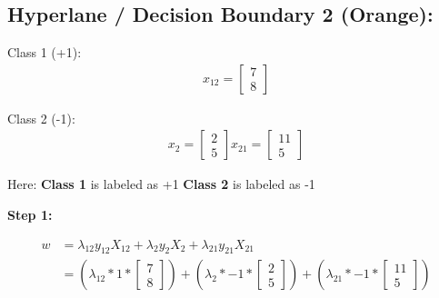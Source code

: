 \documentclass[12pt]{report}
\begin{document}
\vspace{20pt}

\pagebreak
\subsection{Hyperlane / Decision Boundary 2 (Orange):}
Class 1 (+1):
\begin{equation*}
	\begin{aligned}
		x_{12} = \begin{bmatrix}
			         7 \\
			         8
		         \end{bmatrix}
	\end{aligned}
\end{equation*}

Class 2 (-1):
\begin{equation*}
	\begin{aligned}
		x_{2} = \begin{bmatrix}
			        2 \\
			        5
		        \end{bmatrix}
		x_{21} = \begin{bmatrix}
			         11 \\
			         5
		         \end{bmatrix}
	\end{aligned}
\end{equation*}

Here:\newline
\textbf{Class 1} is labeled as +1 \newline
\textbf{Class 2} is labeled as -1


\textbf{Step 1:}

\begin{equation*}
	\begin{aligned}
		w & = \lambda_{12}y_{12}X_{12} + \lambda_{2}y_{2}X_{2}   + \lambda_{21}y_{21}X_{21}                                  \\
		  & = (\lambda_{12} * 1 * \begin{bmatrix}
			                          7 \\
			                          8
		                          \end{bmatrix}) + (\lambda_{2} * -1 * \begin{bmatrix}
			                                                               2 \\
			                                                               5
		                                                               \end{bmatrix})  + (\lambda_{21} * -1 * \begin{bmatrix}
			                                                                                                      11 \\
			                                                                                                      5
		                                                                                                      \end{bmatrix})
	\end{aligned}
\end{equation*}
\end{document}
